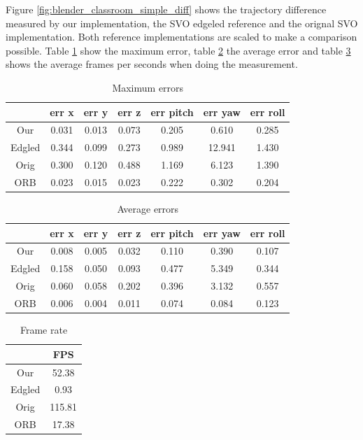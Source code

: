 \documentclass[11pt,a4paper,titlepage,oneside]{report}
\begin{document}
Figure \ref{fig:blender_classroom_simple_diff} shows the trajectory difference measured by our implementation, the SVO edgeled reference and the orignal SVO implementation. Both reference implementations are scaled to make a comparison possible. Table \ref{tab:maximas} show the maximum error, table \ref{tab:average} the average error and table \ref{tab:fps} shows the average frames per seconds when doing the measurement.

\begin{table}[H]
  \centering
  \begin{tabular}{|c|c|c|c|c|c|c|}
  { impl & err x & err y & err z & err pitch & err yaw & err roll }\\
  \hline
  Our & 0.031 & 0.013 & 0.073 & 0.205 & 0.610 & 0.285\\
  Edgled & 0.344 & 0.099 & 0.273 & 0.989 & 12.941 & 1.430\\
  Orig & 0.300 & 0.120 & 0.488 & 1.169 & 6.123 & 1.390\\
  ORB & 0.023 & 0.015 & 0.023 & 0.222 & 0.302 & 0.204
\end{tabular}
\caption{Maximum errors}
\label{tab:maximas}
\end{table}

\begin{table}[H]
  \centering
  \begin{tabular}{|c|c|c|c|c|c|c|}
  { impl & err x & err y & err z & err pitch & err yaw & err roll }\\
  \hline
  Our & 0.008 & 0.005 & 0.032 & 0.110 & 0.390 & 0.107\\
  Edgled & 0.158 & 0.050 & 0.093 & 0.477 & 5.349 & 0.344\\
  Orig & 0.060 & 0.058 & 0.202 & 0.396 & 3.132 & 0.557\\
  ORB & 0.006 & 0.004 & 0.011 & 0.074 & 0.084 & 0.123
\end{tabular}

\caption{Average errors}
\label{tab:average}
\end{table}

\begin{table}[H]
  \centering
  \begin{tabular}{|c|c|}
  { impl & FPS}\\
  \hline
  Our & 52.38\\
  Edgled & 0.93\\
  Orig & 115.81\\
  ORB & 17.38
\end{tabular}
\caption{Frame rate}
\label{tab:fps}
\end{table}
\end{document}
